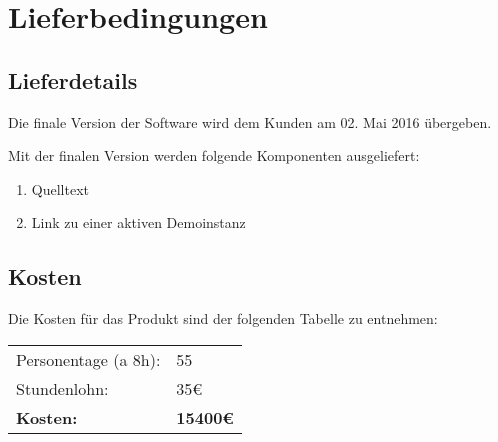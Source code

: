 
\chapter{Lieferbedingungen}
\section{Lieferdetails}
Die finale Version der Software wird dem Kunden am 02. Mai 2016 übergeben.

Mit der finalen Version werden folgende Komponenten ausgeliefert:
\begin{enumerate}
	\item Quelltext
	\item Link zu einer aktiven Demoinstanz
\end{enumerate}


\section{Kosten}
Die Kosten für das Produkt sind der folgenden Tabelle zu entnehmen:
\begin{table}[H]
\begin{tabularx}{\textwidth}{|l|l|}
\toprule
Personentage (a 8h): & 55 \\
Stundenlohn: & 35\euro \\ \hline
\textbf{Kosten:} & \textbf{15400\euro} \\

\hline
\end{tabularx}
\end{table}